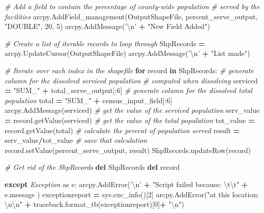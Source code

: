 \documentclass[11pt,]{article}
\newenvironment{Shaded}{\begin{snugshade}}{\end{snugshade}}
\newcommand{\KeywordTok}[1]{\textcolor[rgb]{0.13,0.29,0.53}{\textbf{{#1}}}}
\newcommand{\DecValTok}[1]{\textcolor[rgb]{0.00,0.00,0.81}{{#1}}}
\newcommand{\CharTok}[1]{\textcolor[rgb]{0.31,0.60,0.02}{{#1}}}
\newcommand{\StringTok}[1]{\textcolor[rgb]{0.31,0.60,0.02}{{#1}}}
\newcommand{\ImportTok}[1]{{#1}}
\newcommand{\CommentTok}[1]{\textcolor[rgb]{0.56,0.35,0.01}{\textit{{#1}}}}
\newcommand{\ControlFlowTok}[1]{\textcolor[rgb]{0.13,0.29,0.53}{\textbf{{#1}}}}
\newcommand{\OperatorTok}[1]{\textcolor[rgb]{0.81,0.36,0.00}{\textbf{{#1}}}}
\newcommand{\PreprocessorTok}[1]{\textcolor[rgb]{0.56,0.35,0.01}{\textit{{#1}}}}
\newcommand{\NormalTok}[1]{{#1}}
\begin{document}
\begin{Shaded}
\begin{Highlighting}[]
    \CommentTok{# Add a field to contain the percentage of county-wide population }
    \CommentTok{# served by the facilities}
    \NormalTok{arcpy.AddField_management(OutputShapeFile, percent_serve_output,}
                            \StringTok{"DOUBLE"}\NormalTok{, }\DecValTok{20}\NormalTok{, }\DecValTok{5}\NormalTok{)}
    \NormalTok{arcpy.AddMessage(}\StringTok{'}\CharTok{\textbackslash{}n}\StringTok{'} \OperatorTok{+} \StringTok{"New Field Added"}\NormalTok{)}

    \CommentTok{# Create a list of iterable records to loop through}
    \NormalTok{ShpRecords }\OperatorTok{=} \NormalTok{arcpy.UpdateCursor(OutputShapeFile)}
    \NormalTok{arcpy.AddMessage(}\StringTok{'}\CharTok{\textbackslash{}n}\StringTok{'} \OperatorTok{+} \StringTok{"List made"}\NormalTok{)}

    \CommentTok{# Iterate over each index in the shapefile}
    \ControlFlowTok{for} \NormalTok{record }\OperatorTok{in} \NormalTok{ShpRecords:}
        \CommentTok{# generate  column for the dissolved serviced population }
        \CommentTok{# computed when dissolving}
        \NormalTok{serviced }\OperatorTok{=} \StringTok{"SUM_"} \OperatorTok{+} \NormalTok{total_serve_output[:}\DecValTok{6}\NormalTok{] }
        \CommentTok{# generate column for the dissolved total population}
        \NormalTok{total }\OperatorTok{=} \StringTok{"SUM_"} \OperatorTok{+} \NormalTok{census_input_field[:}\DecValTok{6}\NormalTok{]    }
        \NormalTok{arcpy.AddMessage(serviced)                 }
        \CommentTok{# get the value of the serviced population}
        \NormalTok{serv_value }\OperatorTok{=} \NormalTok{record.getValue(serviced)}
        \CommentTok{# get the value of the total population}
        \NormalTok{tot_value }\OperatorTok{=} \NormalTok{record.getValue(total)}
        \CommentTok{# calculate the percent of population served}
        \NormalTok{result }\OperatorTok{=} \NormalTok{serv_value}\OperatorTok{/}\NormalTok{tot_value              }
        \CommentTok{# save that calculation}
        \NormalTok{record.setValue(percent_serve_output, result)}
        \NormalTok{ShpRecords.updateRow(record)}

    \CommentTok{# Get rid of the ShpRecords}
    \KeywordTok{del} \NormalTok{ShpRecords}
    \KeywordTok{del} \NormalTok{record}

\ControlFlowTok{except} \PreprocessorTok{Exception} \ImportTok{as} \NormalTok{e:}
    \NormalTok{arcpy.AddError(}\StringTok{'}\CharTok{\textbackslash{}n}\StringTok{'} \OperatorTok{+} \StringTok{"Script failed because: }\CharTok{\textbackslash{}t\textbackslash{}t}\StringTok{"} \OperatorTok{+} \NormalTok{e.message )}
    \NormalTok{exceptionreport }\OperatorTok{=} \NormalTok{sys.exc_info()[}\DecValTok{2}\NormalTok{]}
    \NormalTok{arcpy.AddError(}\StringTok{"at this location: }\CharTok{\textbackslash{}n\textbackslash{}n}\StringTok{"} \OperatorTok{+}
    \NormalTok{traceback.format_tb(exceptionreport)[}\DecValTok{0}\NormalTok{]}\OperatorTok{+} \StringTok{"}\CharTok{\textbackslash{}n}\StringTok{"}\NormalTok{)}
\end{Highlighting}
\end{Shaded}
\end{document}
